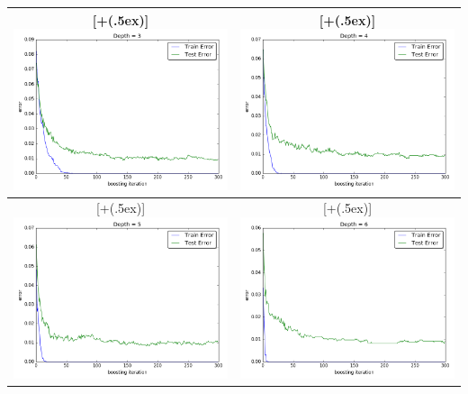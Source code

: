 \documentclass{article}
\newcommand*{\addheight}[2][.5ex]{%
  \raisebox{0pt}[\dimexpr\height+(#1)\relax]{#2}%
}
\begin{document}
\begin{enumerate}
\begin{table}[h!]
\begin{tabular}{|c|c|}
    \hline 
    \addheight{\includegraphics[width=70mm]{images/decision/3.png}} &
	\addheight{\includegraphics[width=70mm]{images/decision/4.png}} \\  
    \hline 
    \addheight{\includegraphics[width=70mm]{images/decision/5.png}} &
	\addheight{\includegraphics[width=70mm]{images/decision/6.png}}\\  
    \hline 
\end{tabular}
\end{table}


\end{enumerate}
\end{document}
